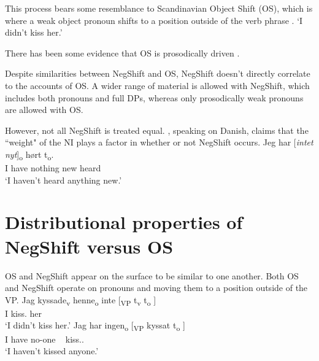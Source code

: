 \documentclass[12pt, letterpaper]{article}
\begin{document}
\ex This process bears some resemblance to Scandinavian Object Shift (OS), which is where a weak object pronoun shifts to a position outside of the verb phrase \citep{holmbergWordOrderSyntactic1986,holmbergRemarksHolmbergGeneralization1999}.
	 
	\glt `I didn't kiss her.'
	\z 

\ex There has been some evidence that OS is prosodically driven \citep{erteschik-shirSoundPatternsSyntax2005,erteschik-shirScandinavianObjectShift2017,erteschik-shirVariationMainlandScandinavian2020,brinkerhoffMATCHINGPhrasesNorwegian2021}. 

\ex Despite similarities between NegShift and OS, NegShift doesn't directly correlate to the accounts of OS. 
	\ea A wider range of material is allowed with NegShift, which includes both pronouns and full DPs, whereas only prosodically weak pronouns are allowed with OS.
	\z 

\ex However, not all NegShift is treated equal. \citet[65f]{christensenInterfacesNegationSyntax2005}, speaking on Danish, claims that the ``weight" of the NI plays a factor in whether or not NegShift occurs. 
	\ea
	\gll Jeg har [\textit{intet} \textit{nyt}]\textsubscript{o} hørt t\textsubscript{o}.\\
	I have nothing new heard\\
	\glt `I haven't heard anything new.'
	\z
\z 

\section{Distributional properties of NegShift versus OS} \label{sec:ENGELS}

\ea OS and NegShift appear on the surface to be similar to one another. 
\ex Both OS and NegShift operate on pronouns and moving them to a position outside of the VP. 
	\ea \label{ex:OS}
		\gll Jag kyssade\textsubscript{v} henne\textsubscript{o} inte [\textsubscript{VP} t\textsubscript{v} t\textsubscript{o} ] \\
		I kiss.\Pst{} her \Neg{}\\
		\glt `I didn't kiss her.'
	\ex \label{ex:NS}
		\gll Jag har ingen\textsubscript{o} [\textsubscript{VP} kyssat t\textsubscript{o} ]\\
		I have no-one ~ kiss.\Pst{}.\Ptcp{} \\
		\glt `I haven't kissed anyone.'
	\z 
	
\end{document}
